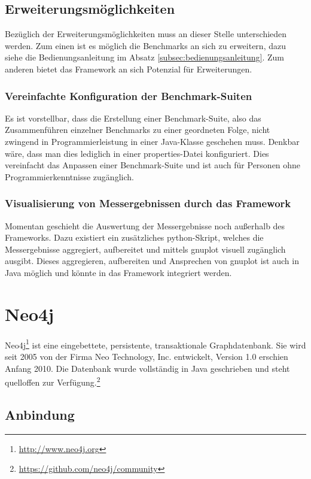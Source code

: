\documentclass[11pt, a4paper, oneside]{article} %
\begin{document}
\subsection{Erweiterungsmöglichkeiten}

Bezüglich der Erweiterungsmöglichkeiten muss an dieser Stelle unterschieden werden. Zum einen ist es möglich die Benchmarks an sich zu erweitern, dazu siehe die Bedienungsanleitung im Absatz \ref{subsec:bedienungsanleitung}. Zum anderen bietet das Framework an sich Potenzial für Erweiterungen.

\subsubsection*{Vereinfachte Konfiguration der Benchmark-Suiten}
Es ist vorstellbar, dass die Erstellung einer Benchmark-Suite, also das Zusammenführen einzelner Benchmarks zu einer geordneten Folge, nicht zwingend in Programmierleistung in einer Java-Klasse geschehen muss. Denkbar wäre, dass man dies lediglich in einer properties-Datei konfiguriert. Dies vereinfacht das Anpassen einer Benchmark-Suite und ist auch für Personen ohne Programmierkenntnisse zugänglich.

\subsubsection*{Visualisierung von Messergebnissen durch das Framework}
Momentan geschieht die Auswertung der Messergebnisse noch außerhalb des Frameworks. Dazu existiert ein zusätzliches python-Skript, welches die Messergebnisse aggregiert, aufbereitet und mittels gnuplot visuell zugänglich ausgibt. Dieses aggregieren, aufbereiten und Ansprechen von gnuplot ist auch in Java möglich und könnte in das Framework integriert werden.

\section{Neo4j}

Neo4j\footnote{\url{http://www.neo4j.org}} ist eine eingebettete, persistente, transaktionale Graphdatenbank. Sie wird seit 2005 von der Firma Neo Technology, Inc. entwickelt, Version 1.0 erschien Anfang 2010. Die Datenbank wurde vollständig in Java geschrieben und steht quelloffen zur Verfügung.\footnote{\url{https://github.com/neo4j/community}}

\subsection{Anbindung}
\end{document}
